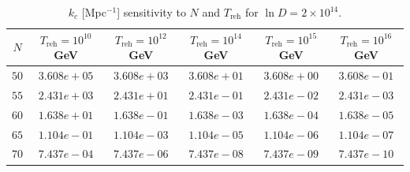 \begin{table}[htbp]
\centering
\caption{$k_c$ [Mpc$^{-1}$] sensitivity to $N$ and $T_{\mathrm{reh}}$ for $\ln D = 2\times 10^{14}$.}
\label{tab:sensitivity}
\begin{tabular}{cccccc}
\hline\hline
$N$ & $T_{\mathrm{reh}} = 10^{10}$ GeV & $T_{\mathrm{reh}} = 10^{12}$ GeV & $T_{\mathrm{reh}} = 10^{14}$ GeV & $T_{\mathrm{reh}} = 10^{15}$ GeV & $T_{\mathrm{reh}} = 10^{16}$ GeV \\
\hline
$50$ & $3.608e+05$ & $3.608e+03$ & $3.608e+01$ & $3.608e+00$ & $3.608e-01$ \\
$55$ & $2.431e+03$ & $2.431e+01$ & $2.431e-01$ & $2.431e-02$ & $2.431e-03$ \\
$60$ & $1.638e+01$ & $1.638e-01$ & $1.638e-03$ & $1.638e-04$ & $1.638e-05$ \\
$65$ & $1.104e-01$ & $1.104e-03$ & $1.104e-05$ & $1.104e-06$ & $1.104e-07$ \\
$70$ & $7.437e-04$ & $7.437e-06$ & $7.437e-08$ & $7.437e-09$ & $7.437e-10$ \\
\hline\hline
\end{tabular}
\end{table}